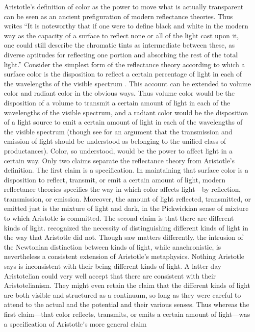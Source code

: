 Aristotle's definition of color as the power to move what is actually transparent can be seen as an ancient prefiguration of modern reflectance theories. Thus \citet[23]{Ross:1906fk} writes ``It is noteworthy that if one were to define black and white in the modern way as the capacity of a surface to reflect none or all of the light cast upon it, one could still describe the chromatic tints as intermediate between these, as diverse aptitudes for reflecting one portion and absorbing the rest of the total light.'' Consider the simplest form of the reflectance theory according to which a surface color is the disposition to reflect a certain percentage of light in each of the wavelengths of the visible spectrum \citep[see][]{Hilbert:1987jq}. This account can be extended to volume color and radiant color in the obvious ways. Thus volume color would be the disposition of a volume to transmit a certain amount of light in each of the wavelengths of the visible spectrum, and a radiant color would be the disposition of a light source to emit a certain amount of light in each of the wavelengths of the visible spectrum (though see \citealt{Byrne:2003we} for an argument that the transmission and emission of light should be understood as belonging to the unified class of productances). Color, so understood, would be the power to affect light in a certain way. Only two claims separate the reflectance theory from Aristotle's definition. The first claim is a specification. In maintaining that surface color is a disposition to reflect, transmit, or emit a certain amount of light, modern reflectance theories specifies the way in which color affects light---by reflection, transmission, or emission. Moreover, the amount of light reflected, transmitted, or emitted just is the mixture of light and dark, in the Pickwickian sense of mixture to which Aristotle is committed. The second claim is that there are different kinds of light. \citet{Newton:1704qv} recognized the necessity of distinguishing different kinds of light in the way that Aristotle did not. Though \citet{Goethe:1810uq} saw matters differently, the intrusion of the Newtonian distinction between kinds of light, while anachronistic, is nevertheless a consistent extension of Aristotle's metaphysics. Nothing Aristotle says is inconsistent with their being different kinds of light. A latter day Aristotelian could very well accept that there are consistent with their Aristotelianism. They might even retain the claim that the different kinds of light are both visible and structured as a continuum, so long as they were careful to attend to the actual and the potential and their various senses. Thus whereas the first claim---that color reflects, transmits, or emits a certain amount of light---was a specification of Aristotle's more general claim 